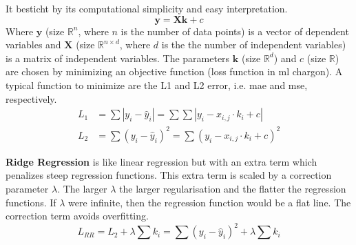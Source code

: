 It besticht by its computational simplicity and easy interpretation. 
\begin{equation}
\mathbf{y} = \mathbf{X} \mathbf{k} +c 
\end{equation}
Where $\mathbf{y}$ (size $\mathbb{R}^n$, where $n$ is the number of data points) is a vector of dependent variables and $\mathbf{X}$ (size $\mathbb{R}^{n\times d}$, where $d$ is the the number of independent variables) is a matrix of independent variables. 
The parameters $\mathbf{k}$ (size $\mathbb{R}^d$) and $c$ (size $\mathbb{R}$) are chosen by minimizing an objective function (loss function in \gls{ml} chargon).
A typical function to minimize are the L1 and L2 error, i.e. \gls{mae} and \gls{mse}, respectively.
\begin{align}
L_1&= \sum |y_i - \hat y_i| = \sum \sum |y_i - x_{i,j}\cdot k_i+c| \\
L_2&= \sum(y_i - \hat y_i)^2 = \sum (y_i - x_{i,j}\cdot k_i+c)^2
\end{align}
%

\textbf{Ridge Regression} is like linear regression but with an extra term which penalizes steep regression functions.
This extra term is scaled by a correction parameter $\lambda$. 
The larger $\lambda$ the larger regularisation and the flatter the regression functions. 
If $\lambda$ were infinite, then the regression function would be a flat line. 
The correction term avoids overfitting. 
\begin{equation}
    L_{RR} = L_2 + \lambda \sum k_i = \sum(y_i - \hat y_i)^2 + \lambda \sum k_i
\end{equation}

